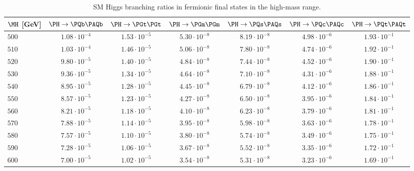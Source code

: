 \begin{table}
  \vspace{-\headsep}
  \caption{SM Higgs branching ratios in fermionic final states in the high-mass range.}
  \label{tab:BR-hm.part1}
  \centering
  \small
  \begin{tabular}{lcccccc}\hline
$\MH$ [GeV] & $\PH \rightarrow \PQb\PAQb$ & $\PH \rightarrow \PGt \PGt$ & $\PH \rightarrow
\PGm \PGm$ & $\PH \rightarrow \PQs \PAQs$ & $\PH \rightarrow \PQc \PAQc$
& $\PH \rightarrow \PQt \PAQt$ \\
\hline
$500 $&$ 1.08\cdot 10^{-4}  $&$ 1.53\cdot 10^{-5}  $&$ 5.30\cdot 10^{-8}  $&$ 8.19\cdot 10^{-8}  $&$ 4.98\cdot 10^{-6}  $&$ 1.93\cdot 10^{-1}  $\\
$510 $&$ 1.03\cdot 10^{-4}  $&$ 1.46\cdot 10^{-5}  $&$ 5.06\cdot 10^{-8}  $&$ 7.80\cdot 10^{-8}  $&$ 4.74\cdot 10^{-6}  $&$ 1.92\cdot 10^{-1}  $\\
$520 $&$ 9.80\cdot 10^{-5}  $&$ 1.40\cdot 10^{-5}  $&$ 4.84\cdot 10^{-8}  $&$ 7.44\cdot 10^{-8}  $&$ 4.52\cdot 10^{-6}  $&$ 1.90\cdot 10^{-1}  $\\
$530 $&$ 9.36\cdot 10^{-5}  $&$ 1.34\cdot 10^{-5}  $&$ 4.64\cdot 10^{-8}  $&$ 7.10\cdot 10^{-8}  $&$ 4.31\cdot 10^{-6}  $&$ 1.88\cdot 10^{-1}  $\\
$540 $&$ 8.95\cdot 10^{-5}  $&$ 1.28\cdot 10^{-5}  $&$ 4.45\cdot 10^{-8}  $&$ 6.79\cdot 10^{-8}  $&$ 4.12\cdot 10^{-6}  $&$ 1.86\cdot 10^{-1}  $\\
$550 $&$ 8.57\cdot 10^{-5}  $&$ 1.23\cdot 10^{-5}  $&$ 4.27\cdot 10^{-8}  $&$ 6.50\cdot 10^{-8}  $&$ 3.95\cdot 10^{-6}  $&$ 1.84\cdot 10^{-1}  $\\
$560 $&$ 8.21\cdot 10^{-5}  $&$ 1.18\cdot 10^{-5}  $&$ 4.10\cdot 10^{-8}  $&$ 6.23\cdot 10^{-8}  $&$ 3.79\cdot 10^{-6}  $&$ 1.81\cdot 10^{-1}  $\\
$570 $&$ 7.88\cdot 10^{-5}  $&$ 1.14\cdot 10^{-5}  $&$ 3.95\cdot 10^{-8}  $&$ 5.98\cdot 10^{-8}  $&$ 3.63\cdot 10^{-6}  $&$ 1.78\cdot 10^{-1}  $\\
$580 $&$ 7.57\cdot 10^{-5}  $&$ 1.10\cdot 10^{-5}  $&$ 3.80\cdot 10^{-8}  $&$ 5.74\cdot 10^{-8}  $&$ 3.49\cdot 10^{-6}  $&$ 1.75\cdot 10^{-1}  $\\
$590 $&$ 7.28\cdot 10^{-5}  $&$ 1.06\cdot 10^{-5}  $&$ 3.67\cdot 10^{-8}  $&$ 5.52\cdot 10^{-8}  $&$ 3.35\cdot 10^{-6}  $&$ 1.72\cdot 10^{-1}  $\\
$600 $&$ 7.00\cdot 10^{-5}  $&$ 1.02\cdot 10^{-5}  $&$ 3.54\cdot 10^{-8}  $&$ 5.31\cdot 10^{-8}  $&$ 3.23\cdot 10^{-6}  $&$ 1.69\cdot 10^{-1}  $\\

\end{tabular}
\end{table}
